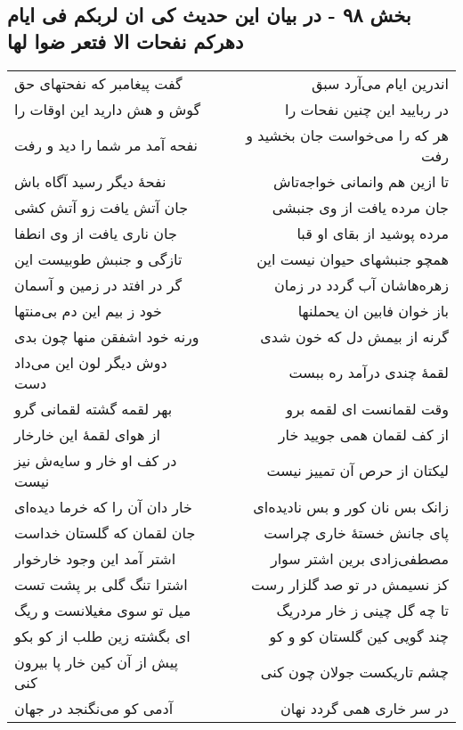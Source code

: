 \begin{center}
\section*{بخش ۹۸ - در بیان این حدیث کی ان لربکم فی ایام دهرکم نفحات الا فتعر ضوا لها}
\label{sec:sh098}
\begin{longtable}{l p{0.5cm} r}
گفت پیغامبر که نفحتهای حق
&&
اندرین ایام می‌آرد سبق
\\
گوش و هش دارید این اوقات را
&&
در ربایید این چنین نفحات را
\\
نفحه آمد مر شما را دید و رفت
&&
هر که را می‌خواست جان بخشید و رفت
\\
نفحهٔ دیگر رسید آگاه باش
&&
تا ازین هم وانمانی خواجه‌تاش
\\
جان آتش یافت زو آتش کشی
&&
جان مرده یافت از وی جنبشی
\\
جان ناری یافت از وی انطفا
&&
مرده پوشید از بقای او قبا
\\
تازگی و جنبش طوبیست این
&&
همچو جنبشهای حیوان نیست این
\\
گر در افتد در زمین و آسمان
&&
زهره‌هاشان آب گردد در زمان
\\
خود ز بیم این دم بی‌منتها
&&
باز خوان فابین ان یحملنها
\\
ورنه خود اشفقن منها چون بدی
&&
گرنه از بیمش دل که خون شدی
\\
دوش دیگر لون این می‌داد دست
&&
لقمهٔ چندی درآمد ره ببست
\\
بهر لقمه گشته لقمانی گرو
&&
وقت لقمانست ای لقمه برو
\\
از هوای لقمهٔ این خارخار
&&
از کف لقمان همی جویید خار
\\
در کف او خار و سایه‌ش نیز نیست
&&
لیکتان از حرص آن تمییز نیست
\\
خار دان آن را که خرما دیده‌ای
&&
زانک بس نان کور و بس نادیده‌ای
\\
جان لقمان که گلستان خداست
&&
پای جانش خستهٔ خاری چراست
\\
اشتر آمد این وجود خارخوار
&&
مصطفی‌زادی برین اشتر سوار
\\
اشترا تنگ گلی بر پشت تست
&&
کز نسیمش در تو صد گلزار رست
\\
میل تو سوی مغیلانست و ریگ
&&
تا چه گل چینی ز خار مردریگ
\\
ای بگشته زین طلب از کو بکو
&&
چند گویی کین گلستان کو و کو
\\
پیش از آن کین خار پا بیرون کنی
&&
چشم تاریکست جولان چون کنی
\\
آدمی کو می‌نگنجد در جهان
&&
در سر خاری همی گردد نهان
\\

\end{longtable}
\end{center}
